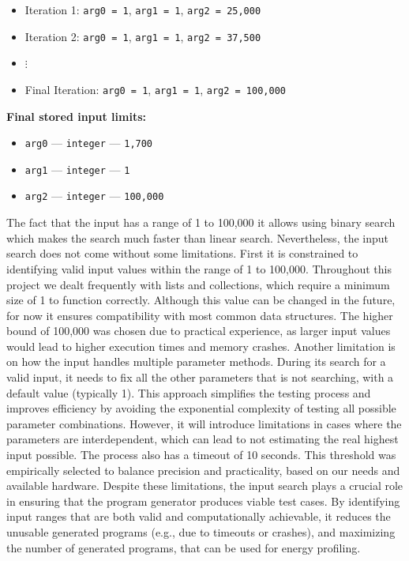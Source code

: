 \begin{tcolorbox}
\begin{itemize}
    \item Iteration 1: \texttt{arg0 = 1}, \texttt{arg1 = 1}, \texttt{arg2 = 25,000}
    \item Iteration 2: \texttt{arg0 = 1}, \texttt{arg1 = 1}, \texttt{arg2 = 37,500}
    \item $\vdots$
    \item Final Iteration: \texttt{arg0 = 1}, \texttt{arg1 = 1}, \texttt{arg2 = 100,000}
\end{itemize}

\textbf{Final stored input limits:}
\begin{itemize}
    \item \texttt{arg0} — \texttt{integer} — \texttt{1,700}
    \item \texttt{arg1} — \texttt{integer} — \texttt{1}
    \item \texttt{arg2} — \texttt{integer} — \texttt{100,000}
\end{itemize}

\end{tcolorbox}


The fact that the input has a range of 1 to 100,000 it allows using binary search which makes the search much faster than linear search.
Nevertheless, the input search does not come without some limitations. First it is constrained to identifying valid input values within the range of 1 to 100,000. Throughout this project we dealt frequently with lists and collections, which require a minimum size of 1 to function correctly. Although this value can be changed in the future, for now it ensures compatibility with most common data structures. The higher bound of 100,000 was chosen due to practical experience, as larger input values would lead to higher execution times and memory crashes. Another limitation is on how the input handles multiple parameter methods. During its search for a valid input, it needs to fix all the other parameters that is not searching, with a default value (typically 1). This approach simplifies the testing process and improves efficiency by avoiding the exponential complexity of testing all possible parameter combinations. However, it will introduce limitations in cases where the parameters are interdependent, which can lead to not estimating the real highest input possible. The process also has a timeout of 10 seconds. This threshold was empirically selected to balance precision and practicality, based on our needs and available hardware.
Despite these limitations, the input search plays a crucial role in ensuring that the program generator produces viable test cases. By identifying input ranges that are both valid and computationally achievable, it reduces the unusable generated programs (e.g., due to timeouts or crashes), and maximizing the number of generated programs, that can be used for energy profiling.




